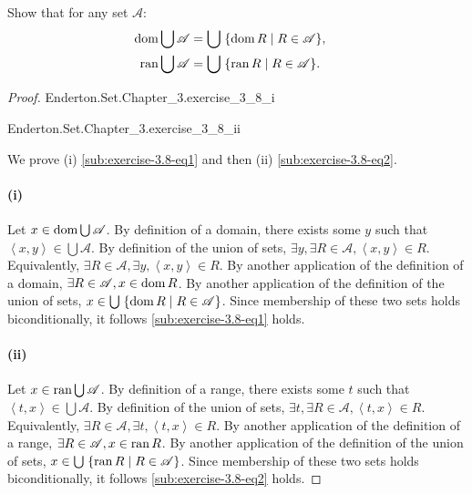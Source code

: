 \documentclass{report}
\begin{document}
Show that for any set $\mathscr{A}$:
  \begin{align}
    \mathop{\text{dom}}{\bigcup{\mathscr{A}}}
      & = \bigcup\;\{ \mathop{\text{dom}}{R} \mid R \in \mathscr{A} \},
      & \label{sub:exercise-3.8-eq1} \\
    \mathop{\text{ran}}{\bigcup{\mathscr{A}}}
      & = \bigcup\;\{ \mathop{\text{ran}}{R} \mid R \in \mathscr{A} \}.
      & \label{sub:exercise-3.8-eq2}
  \end{align}

\begin{proof}

  \statementpadding

    {Enderton.Set.Chapter\_3.exercise\_3\_8\_i}

    {Enderton.Set.Chapter\_3.exercise\_3\_8\_ii}

  We prove (i) \eqref{sub:exercise-3.8-eq1} and then (ii)
    \eqref{sub:exercise-3.8-eq2}.

  \paragraph{(i)}%

    Let $x \in \mathop{\text{dom}}{\bigcup{\mathscr{A}}}$.
    By definition of a domain, there exists some $y$ such that
      $\left< x, y \right> \in \bigcup{\mathscr{A}}$.
    By definition of the union of sets,
      $\exists y, \exists R \in \mathscr{A}, \left< x, y \right> \in R$.
    Equivalently,
      $\exists R \in \mathscr{A}, \exists y, \left< x, y \right> \in R$.
    By another application of the definition of a domain,
      $\exists R \in \mathscr{A}, x \in \mathop{\text{dom}}{R}$.
    By another application of the definition of the union of sets,
      $x \in \bigcup\;\{ \mathop{\text{dom}}{R} \mid R \in \mathscr{A} \}$.
    Since membership of these two sets holds biconditionally, it follows
      \eqref{sub:exercise-3.8-eq1} holds.

  \paragraph{(ii)}%

    Let $x \in \mathop{\text{ran}}{\bigcup{\mathscr{A}}}$.
    By definition of a range, there exists some $t$ such that
      $\left< t, x \right> \in \bigcup{\mathscr{A}}$.
    By definition of the union of sets,
      $\exists t, \exists R \in \mathscr{A}, \left< t, x \right> \in R$.
    Equivalently,
      $\exists R \in \mathscr{A}, \exists t, \left< t, x \right> \in R$.
    By another application of the definition of a range,
      $\exists R \in \mathscr{A}, x \in \mathop{\text{ran}}{R}$.
    By another application of the definition of the union of sets,
      $x \in \bigcup\;\{ \mathop{\text{ran}}{R} \mid R \in \mathscr{A} \}$.
    Since membership of these two sets holds biconditionally, it follows
      \eqref{sub:exercise-3.8-eq2} holds.

\end{proof}
\end{document}
